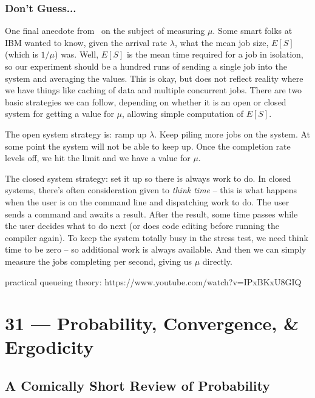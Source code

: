 \documentclass[a4paper]{report}
\begin{document}
\subsection*{Don't Guess...}
One final anecdote from~\cite{pmd} on the subject of measuring $\mu$. Some smart folks at IBM wanted to know, given the arrival rate $\lambda$, what the mean job size, $E[S]$ (which is $1/\mu$) was. Well, $E[S]$ is the mean time required for a job in isolation, so our experiment should be a hundred runs of sending a single job into the system and averaging the values. This is okay, but does not reflect reality where we have things like caching of data and multiple concurrent jobs. There are two basic strategies we can follow, depending on whether it is an open or closed system for getting a value for $\mu$, allowing simple computation of $E[S]$.

The open system strategy is: ramp up $\lambda$. Keep piling more jobs on the system. At some point the system will not be able to keep up. Once the completion rate levels off, we hit the limit and we have a value for $\mu$.

The closed system strategy: set it up so there is always work to do. In closed systems, there's often consideration given to \textit{think time} -- this is what happens when the user is on the command line and dispatching work to do. The user sends a command and awaits a result. After the result, some time passes while the user decides what to do next (or does code editing before running the compiler again). To keep the system totally busy in the stress test, we need think time to be zero -- so additional work is always available. And then we can simply measure the jobs completing per second, giving us $\mu$ directly.




practical queueing theory:  https://www.youtube.com/watch?v=IPxBKxU8GIQ





\chapter*{31 --- Probability, Convergence, \& Ergodicity}


\section*{A Comically Short Review of Probability}
\end{document}
